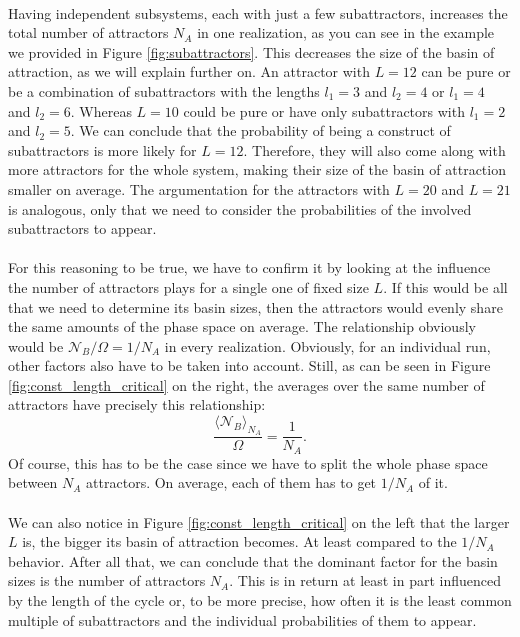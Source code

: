 \paragraph*{}
Having independent subsystems, each with just a few subattractors, increases the total number of attractors $N_A$ in one realization, as you can see in the example we provided in Figure \ref{fig:subattractors}. This decreases the size of the basin of attraction, as we will explain further on. An attractor with $L = 12$ can be pure or be a combination of subattractors with the lengths $l_1=3$ and $l_2=4$ or $l_1=4$ and $l_2=6$. Whereas $L = 10$ could be pure or have only subattractors with $l_1=2$ and $l_2 = 5$. We can conclude that the probability of being a construct of subattractors is more likely for $L=12$. Therefore, they will also come along with more attractors for the whole system, making their size of the basin of attraction smaller on average. The argumentation for the attractors with $L=20$ and $L=21$ is analogous, only that we need to consider the probabilities of the involved subattractors to appear.

\paragraph*{}
For this reasoning to be true, we have to confirm it by looking at the influence the number of attractors plays for a single one of fixed size $ L $. If this would be all that we need to determine its basin sizes, then the attractors would evenly share the same amounts of the phase space on average. The relationship obviously would be $ \mathcal{N}_B/\Omega = 1/N_A $ in every realization. Obviously, for an individual run, other factors also have to be taken into account. Still, as can be seen in Figure \ref{fig:const_length_critical} on the right, the averages over the same number of attractors have precisely this relationship:
\begin{equation}
\frac{\langle \mathcal{N}_B\rangle_{N_A}}{\Omega} = \frac{1}{N_A}.
\end{equation}
Of course, this has to be the case since we have to split the whole phase space between $N_A$ attractors. On average, each of them has to get $1/N_A$ of it. 

\paragraph*{}
We can also notice in Figure \ref{fig:const_length_critical} on the left that the larger $L$ is, the bigger its basin of attraction becomes. At least compared to the $1/N_A$ behavior. After all that, we can conclude that the dominant factor for the basin sizes is the number of attractors $N_A$. This is in return at least in part influenced by the length of the cycle or, to be more precise, how often it is the least common multiple of subattractors and the individual probabilities of them to appear.


